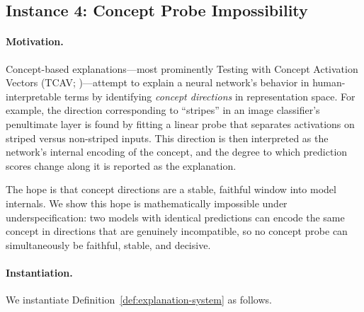 \subsection{Instance 4: Concept Probe Impossibility}
\label{sec:instance-concept}

\paragraph{Motivation.}
Concept-based explanations---most prominently Testing with Concept Activation
Vectors (TCAV; \citealt{kim2018tcav})---attempt to explain a neural network's
behavior in human-interpretable terms by identifying \emph{concept directions}
in representation space.  For example, the direction corresponding to
``stripes'' in an image classifier's penultimate layer is found by fitting a
linear probe that separates activations on striped versus non-striped inputs.
This direction is then interpreted as the network's internal encoding of the
concept, and the degree to which prediction scores change along it is reported
as the explanation.

The hope is that concept directions are a stable, faithful window into model
internals.  We show this hope is mathematically impossible under
underspecification: two models with identical predictions can encode the same
concept in directions that are genuinely incompatible, so no concept probe can
simultaneously be faithful, stable, and decisive.

\paragraph{Instantiation.}
We instantiate Definition~\ref{def:explanation-system} as follows.

